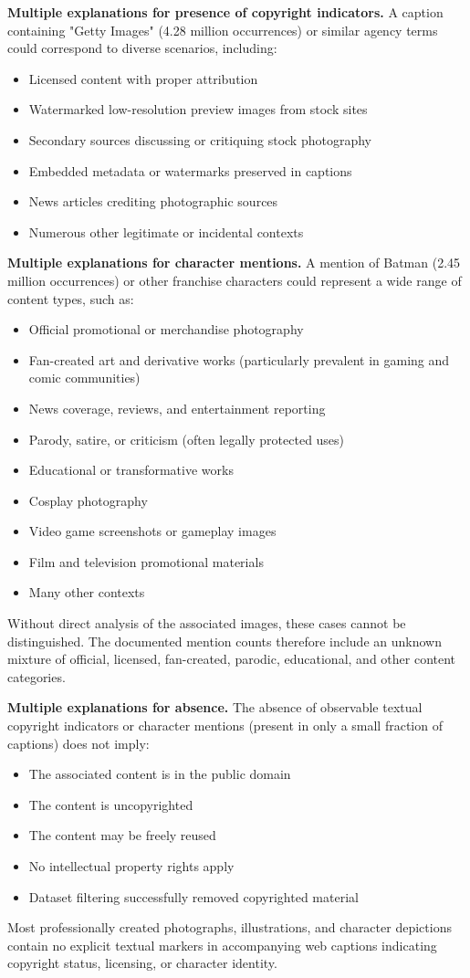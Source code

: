 \documentclass[11pt]{article}
\begin{document}
\textbf{Multiple explanations for presence of copyright indicators.}  
A caption containing "Getty Images" (4.28 million occurrences) or similar agency terms could correspond to diverse scenarios, including:
\begin{itemize}
\item Licensed content with proper attribution
\item Watermarked low-resolution preview images from stock sites
\item Secondary sources discussing or critiquing stock photography
\item Embedded metadata or watermarks preserved in captions
\item News articles crediting photographic sources
\item Numerous other legitimate or incidental contexts
\end{itemize}

\textbf{Multiple explanations for character mentions.}  
A mention of Batman (2.45 million occurrences) or other franchise characters could represent a wide range of content types, such as:
\begin{itemize}
\item Official promotional or merchandise photography
\item Fan-created art and derivative works (particularly prevalent in gaming and comic communities)
\item News coverage, reviews, and entertainment reporting
\item Parody, satire, or criticism (often legally protected uses)
\item Educational or transformative works
\item Cosplay photography
\item Video game screenshots or gameplay images
\item Film and television promotional materials
\item Many other contexts
\end{itemize}
Without direct analysis of the associated images, these cases cannot be distinguished. The documented mention counts therefore include an unknown mixture of official, licensed, fan-created, parodic, educational, and other content categories.

\textbf{Multiple explanations for absence.}  
The absence of observable textual copyright indicators or character mentions (present in only a small fraction of captions) does not imply:
\begin{itemize}
\item The associated content is in the public domain
\item The content is uncopyrighted
\item The content may be freely reused
\item No intellectual property rights apply
\item Dataset filtering successfully removed copyrighted material
\end{itemize}
Most professionally created photographs, illustrations, and character depictions contain no explicit textual markers in accompanying web captions indicating copyright status, licensing, or character identity.
\end{document}

